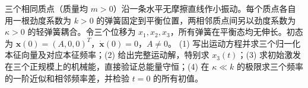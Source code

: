三个相同质点（质量均 \(m>0\)）沿一条水平无摩擦直线作小振动。每个质点各自用一根劲度系数为 \(k>0\) 的弹簧固定到平衡位置，两相邻质点间另以劲度系数为 \(\kappa>0\) 的轻弹簧耦合。令三个位移为 \(x_1,x_2,x_3\)，所有弹簧在平衡态均无伸长。初态为 \(\boldsymbol x(0)=(A,0,0)^T\)，\(\dot{\boldsymbol x}(0)=0\)，\(A\ne0\)。
(1) 写出运动方程并求三个归一化本征向量及对应本征频率；(2) 给出完整运动解，特别求 \(x_3(t)\)；(3) 求初始激发在三个正规模上的机械能，直接验证总能量守恒；(4) 在 \(\kappa\ll k\) 的极限求三个频率的一阶近似和相邻频率差，并检验 \(t=0\) 的所有初值。
